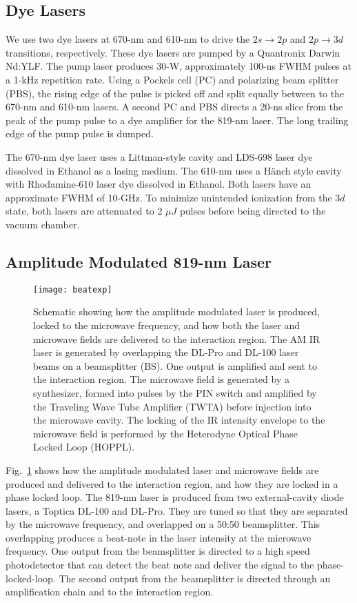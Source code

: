 \documentclass[aps,pra,preprint,groupedaddress]{revtex4-1}
\begin{document}
\subsection{Dye Lasers}
\label{sec:dye}

We use two dye lasers at 670-nm and 610-nm to drive the $2s \rightarrow 2p$ and $2p \rightarrow 3d$ transitions, respectively. These dye lasers are pumped by a Quantronix Darwin Nd:YLF. The pump laser produces 30-W, approximately 100-ns FWHM pulses at a 1-kHz repetition rate. Using a Pockels cell (PC) and polarizing beam splitter (PBS), the rising edge of the pulse is picked off and split equally between to the 670-nm and 610-nm lasers. A second PC and PBS directs a 20-ns slice from the peak of the pump pulse to a dye amplifier for the 819-nm laser. The long trailing edge of the pump pulse is dumped.

The 670-nm dye laser uses a Littman-style cavity and LDS-698 laser dye dissolved in Ethanol as a lasing medium. The 610-nm uses a H{\"a}nch style cavity with Rhodamine-610 laser dye dissolved in Ethanol. Both lasers have an approximate FWHM of 10-GHz. To minimize unintended ionization from the $3d$ state, both lasers are attenuated to 2 $\mu J$ pulses before being directed to the vacuum chamber.

\subsection{Amplitude Modulated 819-nm Laser}
\label{sec:ampmod}

\begin{figure}
	\texttt{[image: beatexp]}
	\caption{Schematic showing how the amplitude modulated laser is produced, locked to the microwave frequency, and how both the laser and microwave fields are delivered to the interaction region. The AM IR laser is generated by overlapping the DL-Pro and DL-100 laser beams on a beamsplitter (BS). One output is amplified and sent to the interaction region. The microwave field is generated by a synthesizer, formed into pulses by the PIN switch and amplified by the Traveling Wave Tube Amplifier (TWTA) before injection into the microwave cavity. The locking of the IR intensity envelope to the microwave field is performed by the Heterodyne Optical Phase Locked Loop (HOPPL).}
	\label{fig:pll}
\end{figure}

Fig.~\ref{fig:pll} shows how the amplitude modulated laser and microwave fields are produced and delivered to the interaction region, and how they are locked in a phase locked loop. The 819-nm laser is produced from two external-cavity diode lasers, a Toptica DL-100 and DL-Pro. They are tuned so that they are separated by the microwave frequency, and overlapped on a 50:50 beamsplitter. This overlapping produces a beat-note in the laser intensity at the microwave frequency. One output from the beamsplitter is directed to a high speed photodetector that can detect the beat note and deliver the signal to the phase-locked-loop. The second output from the beamsplitter is directed through an amplification chain and to the interaction region.
\end{document}

